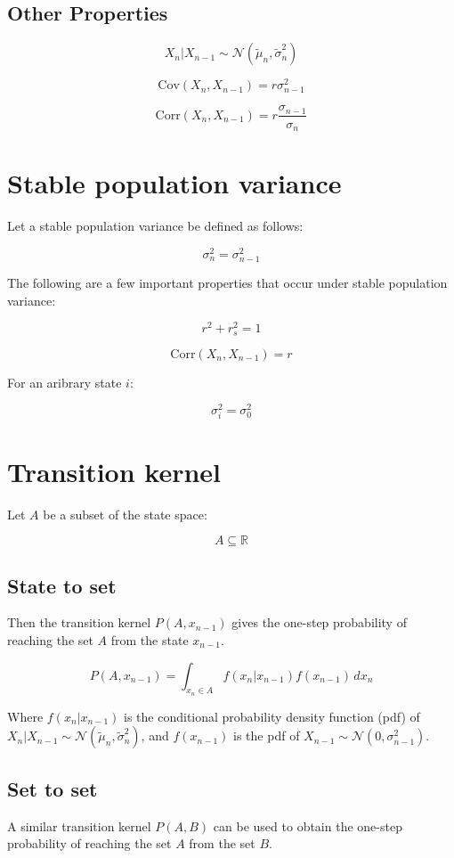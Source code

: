 \documentclass[a4paper,11pt]{article}
\begin{document}
\subsection{Other Properties}

$$X_n|X_{n-1} \sim \mathcal{N}(\tilde{\mu}_n, \tilde{\sigma}_n^2)$$


$$\mathrm{Cov}(X_n, X_{n-1}) = r \sigma_{n-1}^2$$

$$\mathrm{Corr}(X_n, X_{n-1}) = r \frac{\sigma_{n-1}}{\sigma_n}$$


\section{Stable population variance}
Let a stable population variance be defined as follows:

$$\sigma_n^2 = \sigma_{n-1}^2$$

The following are a few important properties that occur under stable population variance:

$$r^2+r_s^2 = 1$$

$$\mathrm{Corr}(X_n, X_{n-1}) = r$$

For an aribrary state $i$:

$$\sigma_i^2 = \sigma_{0}^2$$




\section{Transition kernel}

Let $A$ be a subset of the state space:

$$A \subseteq \mathbb{R}$$

\subsection{State to set}
Then the transition kernel $P(A, x_{n-1})$ gives the one-step probability of reaching the set $A$ from the state $x_{n-1}$. 

$$P(A, x_{n-1}) = \int_{x_n\in A}^{} f(x_n|x_{n-1})f(x_{n-1}) \, dx_{n}$$

Where $f(x_n|x_{n-1})$ is the conditional probability density function (pdf) of $X_n|X_{n-1} \sim \mathcal{N}(\tilde{\mu}_n, \tilde{\sigma}_n^2)$, and $f(x_{n-1})$ is the pdf of $X_{n-1} \sim \mathcal{N}(0, \sigma_{n-1}^2)$.

\subsection{Set to set}
A similar transition kernel $P(A, B)$ can be used to obtain the one-step probability of reaching the set $A$ from the set $B$. 
\end{document}

